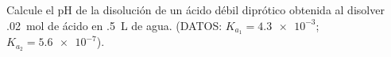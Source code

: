 Calcule el $\mathrm{pH}$ de la disolución de un ácido débil diprótico obtenida al disolver \SI{,02}{\mol} de ácido en \SI{,5}{\liter} de agua. (DATOS: $K_{a_1} = \num{4,3e-3}$; $K_{a_2} = \num{5,6e-7}$).
